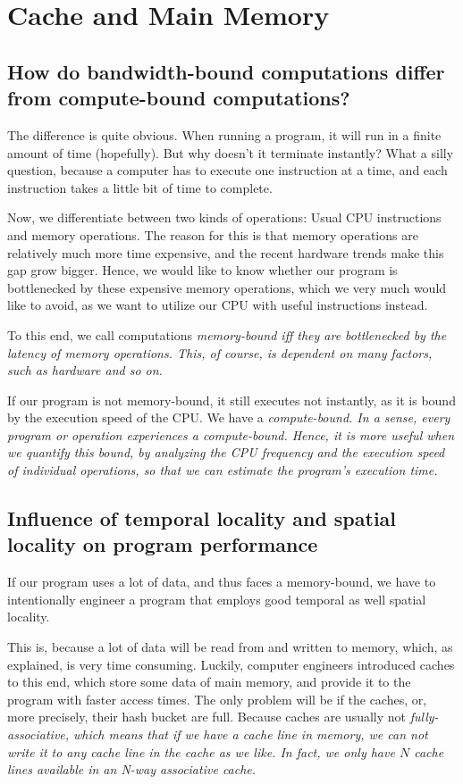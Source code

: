 \documentclass[../../main.tex]{subfiles}
\begin{document}
\section{Cache and Main Memory}
\subsection{How do bandwidth-bound computations differ from
compute-bound computations?}
The difference is quite obvious. When running a program, it will run in a finite amount of time (hopefully). But why doesn't it terminate instantly? What a silly question, because a computer has to execute one instruction at a time, and each instruction takes a little bit of time to complete.

Now, we differentiate between two kinds of operations: Usual CPU instructions and memory operations. The reason for this is that memory operations are relatively much more time expensive, and the recent hardware trends make this gap grow bigger. Hence, we would like to know whether our program is bottlenecked by these expensive memory operations, which we very much would like to avoid, as we want to utilize our CPU with useful instructions instead.

To this end, we call computations \em memory-bound \em iff they are bottlenecked by the latency of memory operations. This, of course, is dependent on many factors, such as hardware and so on.

If our program is not memory-bound, it still executes not instantly, as it is bound by the execution speed of the CPU. We have a \em compute-bound\em . In a sense, every program or operation experiences a compute-bound. Hence, it is more useful when we quantify this bound, by analyzing the CPU frequency and the execution speed of individual operations, so that we can estimate the program's execution time.

\bigskip
\subsection{Influence of temporal locality and spatial locality on program performance}
If our program uses a lot of data, and thus faces a memory-bound, we have to intentionally engineer a program that employs good temporal as well spatial locality.

This is, because a lot of data will be read from and written to memory, which, as explained, is very time consuming. Luckily, computer engineers introduced caches to this end, which store some data of main memory, and provide it to the program with faster access times. The only problem will be if the caches, or, more precisely, their hash bucket are full. Because caches are usually not \em fully-associative\em , which means that if we have a cache line in memory, we can not write it to any cache line in the cache as we like. In fact, we only have $N$ cache lines available in an \em N-way associative \em cache.
\end{document}
